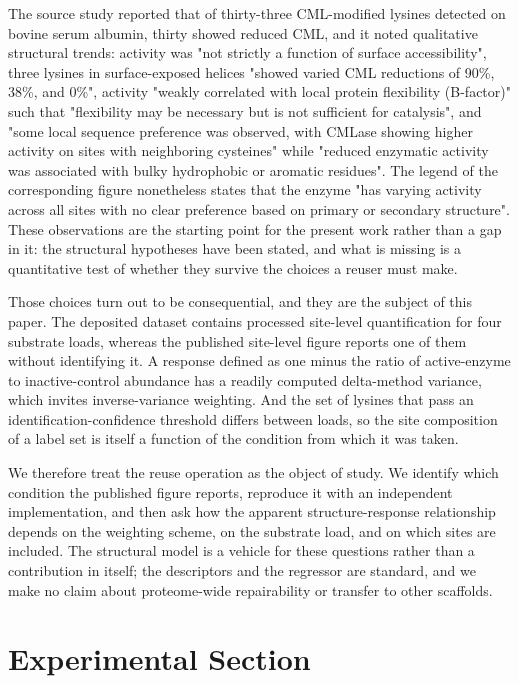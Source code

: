 \documentclass[journal=jprobs,manuscript=article,layout=traditional]{achemso}
\begin{document}
The source study reported that of thirty-three CML-modified lysines detected on bovine serum albumin, thirty showed reduced CML, and it noted qualitative structural trends: activity was "not strictly a function of surface accessibility", three lysines in surface-exposed helices "showed varied CML reductions of 90\%, 38\%, and 0\%", activity "weakly correlated with local protein flexibility (B-factor)" such that "flexibility may be necessary but is not sufficient for catalysis", and "some local sequence preference was observed, with CMLase showing higher activity on sites with neighboring cysteines" while "reduced enzymatic activity was associated with bulky hydrophobic or aromatic residues". The legend of the corresponding figure nonetheless states that the enzyme "has varying activity across all sites with no clear preference based on primary or secondary structure". These observations are the starting point for the present work rather than a gap in it: the structural hypotheses have been stated, and what is missing is a quantitative test of whether they survive the choices a reuser must make.

Those choices turn out to be consequential, and they are the subject of this paper. The deposited dataset contains processed site-level quantification for four substrate loads, whereas the published site-level figure reports one of them without identifying it. A response defined as one minus the ratio of active-enzyme to inactive-control abundance has a readily computed delta-method variance, which invites inverse-variance weighting. And the set of lysines that pass an identification-confidence threshold differs between loads, so the site composition of a label set is itself a function of the condition from which it was taken.

We therefore treat the reuse operation as the object of study. We identify which condition the published figure reports, reproduce it with an independent implementation, and then ask how the apparent structure-response relationship depends on the weighting scheme, on the substrate load, and on which sites are included. The structural model is a vehicle for these questions rather than a contribution in itself; the descriptors and the regressor are standard, and we make no claim about proteome-wide repairability or transfer to other scaffolds.

\section{Experimental Section}
\end{document}
